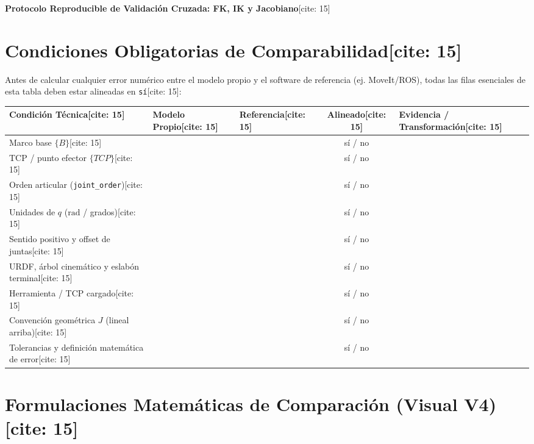 \documentclass[11pt, a4paper]{article}
\begin{document}
\begin{center}
    \Large\textbf{\textcolor{ucbblue}{Protocolo Reproducible de Validación Cruzada: FK, IK y Jacobiano}}[cite: 15]
\end{center}

\section{Condiciones Obligatorias de Comparabilidad[cite: 15]}
Antes de calcular cualquier error numérico entre el modelo propio y el software de referencia (ej. MoveIt/ROS), todas las filas esenciales de esta tabla deben estar alineadas en \texttt{sí}[cite: 15]:

\begin{center}
\footnotesize
\renewcommand{\arraystretch}{1.35}
\begin{tabularx}{\textwidth}{|>{\hsize=1.2\hsize\raggedright\arraybackslash}X|>{\hsize=0.9\hsize\raggedright\arraybackslash}X|>{\hsize=0.9\hsize\raggedright\arraybackslash}X|c|>{\hsize=1.0\hsize\raggedright\arraybackslash}X|}
\hline
\rowcolor{ucbblue!15}
\textbf{Condición Técnica}[cite: 15] & \textbf{Modelo Propio}[cite: 15] & \textbf{Referencia}[cite: 15] & \textbf{Alineado}[cite: 15] & \textbf{Evidencia / Transformación}[cite: 15] \\ \hline
Marco base $\{B\}$[cite: 15] & & & sí / no & \\ \hline
TCP / punto efector $\{TCP\}$[cite: 15] & & & sí / no & \\ \hline
Orden articular (\texttt{joint\_order})[cite: 15] & & & sí / no & \\ \hline
Unidades de $q$ ($\mathrm{rad}$ / grados)[cite: 15] & & & sí / no & \\ \hline
Sentido positivo y offset de juntas[cite: 15] & & & sí / no & \\ \hline
URDF, árbol cinemático y eslabón terminal[cite: 15] & & & sí / no & \\ \hline
Herramienta / TCP cargado[cite: 15] & & & sí / no & \\ \hline
Convención geométrica $J$ (lineal arriba)[cite: 15] & & & sí / no & \\ \hline
Tolerancias y definición matemática de error[cite: 15] & & & sí / no & \\ \hline
\end{tabularx}
\end{center}

\section{Formulaciones Matemáticas de Comparación (Visual V4)[cite: 15]}
\end{document}
